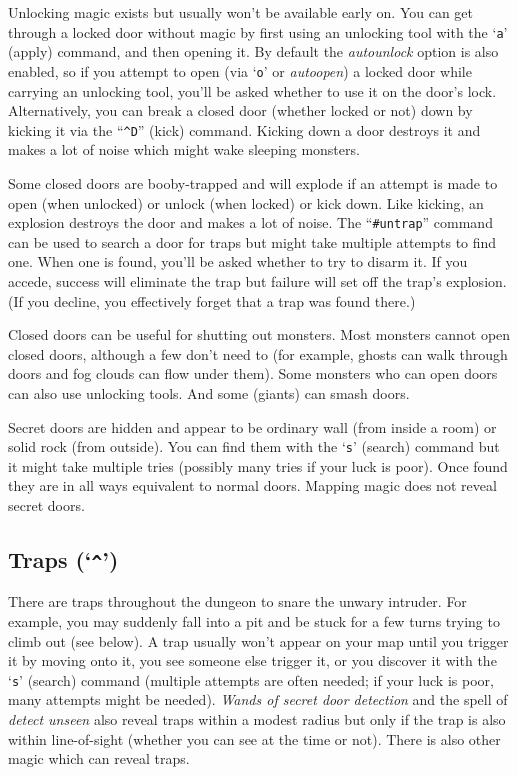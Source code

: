 Unlocking magic exists but usually won't be available early on.
You can get through a locked door without magic by first using an
unlocking tool with the `{\tt a}' (apply) command, and then opening it.
By default the
{\it autounlock}
option is also enabled, so if you attempt to open (via `{\tt o}' or
{\it autoopen})
a locked door while carrying an unlocking tool, you'll be asked whether
to use it on the door's lock.
Alternatively, you can break a closed door (whether locked or not) down
by kicking it via the ``{\tt \^{}D}'' (kick) command.
Kicking down a door destroys it and makes a lot of noise which might
wake sleeping monsters.

Some closed doors are booby-trapped and will explode if an attempt is made
to open (when unlocked) or unlock (when locked) or kick down.
Like kicking, an explosion destroys the door and makes a lot of noise.
The ``{\tt \#untrap}'' command can be used to search a door for traps but
might take multiple attempts to find one.
When one is found, you'll be asked whether to try to disarm it.
If you accede, success will eliminate the trap but
failure will set off the trap's explosion.
(If you decline, you effectively forget that a trap was found there.)

Closed doors can be useful for shutting out monsters.
Most monsters cannot open closed doors, although a few don't need to
(for example, ghosts can walk through doors and fog clouds can flow
under them).
Some monsters who can open doors can also use unlocking tools.
And some (giants) can smash doors.

Secret doors are hidden and appear to be ordinary wall (from inside a
room) or solid rock (from outside).
You can find them with the `{\tt s}' (search) command but it might
take multiple tries (possibly many tries if your luck is poor).
Once found they are in all ways equivalent to normal doors.
Mapping magic does not reveal secret doors.

\subsection*{Traps (`{\tt \^{}}')}

There are traps throughout the dungeon to snare the unwary intruder.
For example, you may suddenly fall into a pit and be stuck for a few
turns trying to climb out (see below).
A trap usually won't appear on your map until you trigger it by moving
onto it, you see someone else trigger it, or you discover it with
the `{\tt s}' (search) command (multiple attempts are often needed;
if your luck is poor, many attempts might be needed).
{\it Wands of secret door detection\/} and the spell of {\it detect unseen}
also reveal traps within a modest radius but only if the trap is also within
line-of-sight (whether you can see at the time or not).
There is also other magic which can reveal traps.

